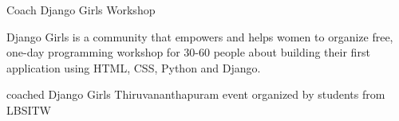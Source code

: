

\begin{cventries}

  \cventry
    {Coach} %
    {Django Girls Workshop} %
    {} %
    {} %
    {
      \begin{cvparagraph} %
       Django Girls is a community that empowers and helps women to organize free, one-day programming workshop for 30-60 people about building their first application using HTML, CSS, Python and Django.
      \end{cvparagraph}
   }
    {
      \begin{cvitems} %
        \item {coached Django Girls Thiruvananthapuram event organized by students from LBSITW}
      \end{cvitems}
    }

\end{cventries}
